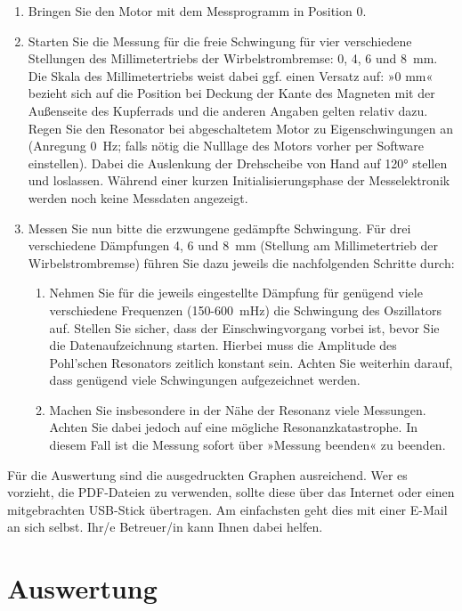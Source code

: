 \begin{enumerate}
	\item Bringen Sie den Motor mit dem Messprogramm in Position 0.
	\item Starten Sie die Messung für die freie Schwingung für vier verschiedene Stellungen des Millimetertriebs der Wirbelstrombremse: 0, 4, 6 und 8~mm. Die Skala des Millimetertriebs weist dabei ggf. einen Versatz auf: »0 mm« bezieht sich auf die Position bei Deckung der Kante des Magneten mit der Außenseite des Kupferrads und die anderen Angaben gelten relativ dazu. Regen Sie den Resonator bei abgeschaltetem Motor zu Eigenschwingungen an (Anregung 0~Hz; falls nötig die Nulllage des Motors vorher per Software einstellen). Dabei die Auslenkung der Drehscheibe von Hand auf 120° stellen und loslassen. Während einer kurzen Initialisierungsphase der Messelektronik werden noch keine Messdaten angezeigt.
	\item Messen Sie nun bitte die erzwungene gedämpfte Schwingung. Für drei verschiedene Dämpfungen 4, 6 und 8~mm (Stellung am Millimetertrieb der Wirbelstrombremse) führen Sie dazu jeweils die nachfolgenden Schritte durch:
	\begin{enumerate}
		\item Nehmen Sie für die jeweils eingestellte Dämpfung für genügend viele verschiedene Frequenzen (150-600~mHz) die Schwingung des Oszillators auf. Stellen Sie sicher, dass 
		der Einschwingvorgang vorbei ist, bevor Sie die Datenaufzeichnung starten. Hierbei muss die Amplitude des Pohl'schen Resonators zeitlich konstant sein. Achten Sie weiterhin darauf, dass genügend viele Schwingungen aufgezeichnet werden.
		\item Machen Sie insbesondere in der Nähe der Resonanz viele Messungen. Achten Sie dabei jedoch auf eine mögliche Resonanzkatastrophe. In diesem Fall ist die Messung sofort über »Messung beenden« zu beenden.
	\end{enumerate}
\end{enumerate}
Für die Auswertung sind die ausgedruckten Graphen ausreichend. Wer es vorzieht, die PDF-Dateien zu verwenden, sollte diese über das Internet oder einen mitgebrachten USB-Stick übertragen. Am einfachsten geht dies mit einer E-Mail an sich selbst. Ihr/e Betreuer/in kann Ihnen dabei helfen.

\section{Auswertung} 

